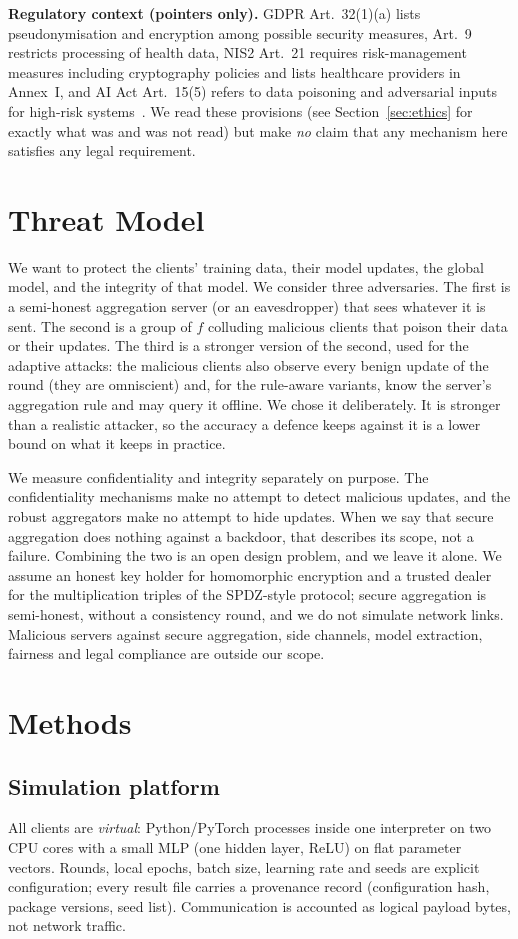 \documentclass[conference]{IEEEtran}
\begin{document}
\textbf{Regulatory context (pointers only).} GDPR Art.~32(1)(a) lists pseudonymisation and encryption among possible security measures, Art.~9 restricts processing of health data, NIS2 Art.~21 requires risk-management measures including cryptography policies and lists healthcare providers in Annex~I, and AI Act Art.~15(5) refers to data poisoning and adversarial inputs for high-risk systems~\cite{gdpr,nis2,aiact}. We read these provisions (see Section~\ref{sec:ethics} for exactly what was and was not read) but make \emph{no} claim that any mechanism here satisfies any legal requirement.
\section{Threat Model}
We want to protect the clients' training data, their model updates, the global model, and the integrity of that model. We consider three adversaries. The first is a semi-honest aggregation server (or an eavesdropper) that sees whatever it is sent. The second is a group of $f$ colluding malicious clients that poison their data or their updates. The third is a stronger version of the second, used for the adaptive attacks: the malicious clients also observe every benign update of the round (they are omniscient) and, for the rule-aware variants, know the server's aggregation rule and may query it offline. We chose it deliberately. It is stronger than a realistic attacker, so the accuracy a defence keeps against it is a lower bound on what it keeps in practice.

We measure confidentiality and integrity separately on purpose. The confidentiality mechanisms make no attempt to detect malicious updates, and the robust aggregators make no attempt to hide updates. When we say that secure aggregation does nothing against a backdoor, that describes its scope, not a failure. Combining the two is an open design problem, and we leave it alone. We assume an honest key holder for homomorphic encryption and a trusted dealer for the multiplication triples of the SPDZ-style protocol; secure aggregation is semi-honest, without a consistency round, and we do not simulate network links. Malicious servers against secure aggregation, side channels, model extraction, fairness and legal compliance are outside our scope.
\section{Methods}
\subsection{Simulation platform}
All clients are \emph{virtual}: Python/PyTorch processes inside one interpreter on two CPU cores with a small MLP (one hidden layer, ReLU) on flat parameter vectors. Rounds, local epochs, batch size, learning rate and seeds are explicit configuration; every result file carries a provenance record (configuration hash, package versions, seed list). Communication is accounted as logical payload bytes, not network traffic.
\end{document}
